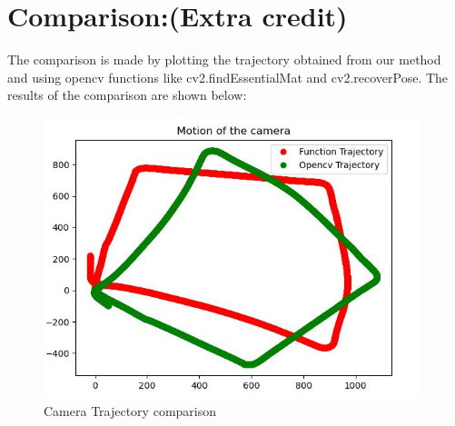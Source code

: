 \documentclass[12pt]{article}
\begin{document}
\section{Comparison:(Extra credit)}
The comparison is made by plotting the trajectory obtained from our method and using opencv functions like cv2.findEssentialMat and cv2.recoverPose. The results of the comparison are shown below:
\begin{figure}[h]
    \centering
    \includegraphics[width=11cm]{output2}
    \caption{Camera Trajectory comparison}
    \label{fig:Camera Trajectory comparison}
\end{figure}
\end{document}
